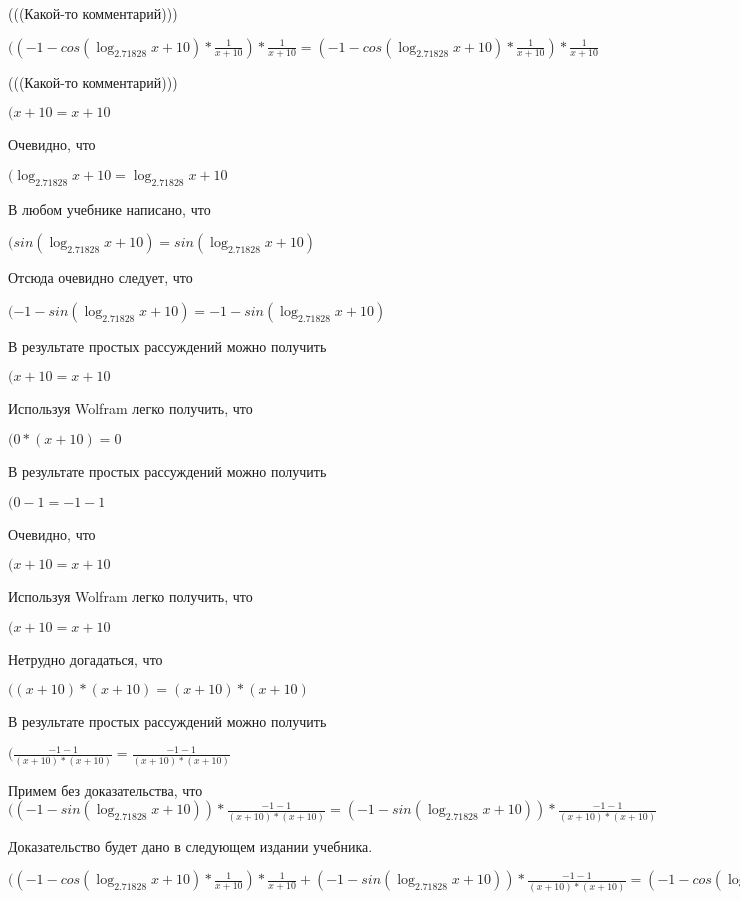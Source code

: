 \documentclass[12pt,a4paper,fleqn]{article}
\theoremstyle{definition}
\begin{document}
(((Какой-то комментарий)))

$(( -1  - cos(\log_{ 2.71828 }{ x  +  10 }) * \frac{ 1 }{ x  +  10 }
) * \frac{ 1 }{ x  +  10 }
 = ( -1  - cos(\log_{ 2.71828 }{ x  +  10 }) * \frac{ 1 }{ x  +  10 }
) * \frac{ 1 }{ x  +  10 }
$

(((Какой-то комментарий)))

$( x  +  10  =  x  +  10 $

Очевидно, что

$(\log_{ 2.71828 }{ x  +  10 } = \log_{ 2.71828 }{ x  +  10 }$

В любом учебнике написано, что

$(sin(\log_{ 2.71828 }{ x  +  10 }) = sin(\log_{ 2.71828 }{ x  +  10 })$

Отсюда очевидно следует, что

$( -1  - sin(\log_{ 2.71828 }{ x  +  10 }) =  -1  - sin(\log_{ 2.71828 }{ x  +  10 })$

В результате простых рассуждений можно получить

$( x  +  10  =  x  +  10 $

Используя Wolfram легко получить, что

$( 0  * ( x  +  10 ) =  0 $

В результате простых рассуждений можно получить

$( 0  -  1  =  -1  -  1 $

Очевидно, что

$( x  +  10  =  x  +  10 $

Используя Wolfram легко получить, что

$( x  +  10  =  x  +  10 $

Нетрудно догадаться, что

$(( x  +  10 ) * ( x  +  10 ) = ( x  +  10 ) * ( x  +  10 )$

В результате простых рассуждений можно получить

$(\frac{ -1  -  1 }{( x  +  10 ) * ( x  +  10 )}
 = \frac{ -1  -  1 }{( x  +  10 ) * ( x  +  10 )}
$

Примем без доказательства, что
$(( -1  - sin(\log_{ 2.71828 }{ x  +  10 })) * \frac{ -1  -  1 }{( x  +  10 ) * ( x  +  10 )}
 = ( -1  - sin(\log_{ 2.71828 }{ x  +  10 })) * \frac{ -1  -  1 }{( x  +  10 ) * ( x  +  10 )}
$

Доказательство будет дано в следующем издании учебника.

$(( -1  - cos(\log_{ 2.71828 }{ x  +  10 }) * \frac{ 1 }{ x  +  10 }
) * \frac{ 1 }{ x  +  10 }
 + ( -1  - sin(\log_{ 2.71828 }{ x  +  10 })) * \frac{ -1  -  1 }{( x  +  10 ) * ( x  +  10 )}
 = ( -1  - cos(\log_{ 2.71828 }{ x  +  10 }) * \frac{ 1 }{ x  +  10 }
) * \frac{ 1 }{ x  +  10 }
 + ( -1  - sin(\log_{ 2.71828 }{ x  +  10 })) * \frac{ -1  -  1 }{( x  +  10 ) * ( x  +  10 )}
$
\end{document}
